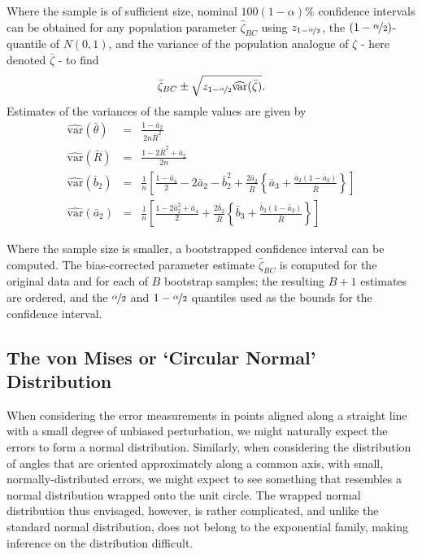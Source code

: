 \documentclass[../../ArchStats.tex]{subfiles}
\begin{document}
Where the sample is of sufficient size, nominal $100(1-\alpha)\%$ confidence intervals can be obtained for any population parameter $\hat{\zeta}_{BC}$ using $z_{1-\nicefrac{\alpha}{2}}$, the $(1-\nicefrac{\alpha}{2})$-quantile of $N(0,1)$, and the variance of the population analogue of $\zeta$ - here denoted $\bar{\zeta}$ - to find
\begin{equation}
\bar{\zeta}_{BC} \pm \sqrt{z_{1-\nicefrac{\alpha}{2}} \widehat{\text{var}}(\bar{\zeta})}. \end{equation}
Estimates of the variances of the sample values are given by
	\begin{eqnarray}
	\widehat{\text{var}}(\bar{\theta}) &=& \frac{1-\bar{a}_2}{2n\bar{R}^2} \\[5pt]
	\widehat{\text{var}}(\bar{R}) &=& \frac{1-2\bar{R}^2 + \bar{a}_2}{2n} \\[5pt]
	\label{eqn:var-b-2}
	\widehat{\text{var}}(\bar{b}_2) &=& \frac{1}{n}\left[ \frac{1-\bar{a}_4}{2} - 2\bar{a}_2 - \bar{b}_2^2 + \frac{2\bar{a}_2}{\bar{R}} \left\lbrace \bar{a}_3 + \frac{\bar{a}_2 (1-\bar{a}_2)}{\bar{R}} \right\rbrace \right] \\[5pt]
	\widehat{\text{var}}(\bar{a}_2) &=& \frac{1}{n}\left[ \frac{1-2\bar{a}_2^2 + \bar{a}_4}{2} + \frac{2\bar{b}_2}{\bar{R}} \left\lbrace \bar{b}_3 + \frac{\bar{b}_2 (1-\bar{a}_2)}{\bar{R}} \right\rbrace \right]
	\end{eqnarray}


Where the sample size is smaller, a bootstrapped confidence interval can be computed. The bias-corrected parameter estimate $\hat{\zeta}_{BC}$ is computed for the original data and for each of $B$ bootstrap samples; the resulting $B+1$ estimates are ordered, and the $\nicefrac{\alpha}{2}$ and $1- \nicefrac{\alpha}{2}$ quantiles used as the bounds for the confidence interval.



\subsection{The von Mises or `Circular Normal' Distribution}
\label{sec:vonMises}

When considering the error measurements in points aligned along a straight line with a small degree of unbiased perturbation, we might naturally expect the errors to form a normal distribution. Similarly, when considering the distribution of angles that are oriented approximately along a common axis, with small, normally-distributed errors, we might expect to see something that resembles a normal distribution wrapped onto the unit circle. The wrapped normal distribution thus envisaged, however, is rather complicated, and unlike the standard normal distribution, does not belong to the exponential family, making inference on the distribution difficult.
\end{document}
